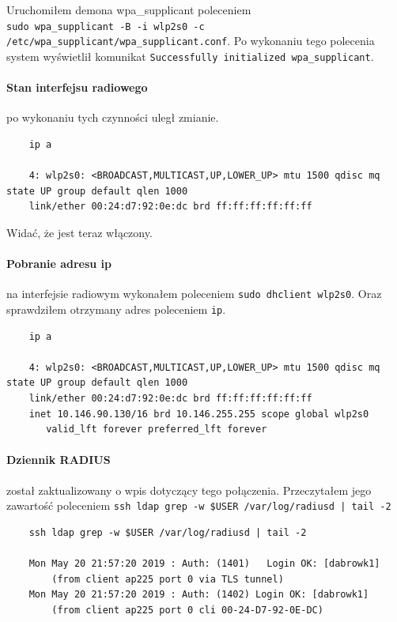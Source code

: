 \documentclass{article} %
\begin{document}
\vspace{5 mm}
Uruchomiłem demona wpa\_supplicant poleceniem \\\texttt{sudo wpa\_supplicant -B -i wlp2s0 -c /etc/wpa\_supplicant/wpa\_supplicant.conf}.
Po wykonaniu tego polecenia system wyświetlił komunikat \texttt{Successfully initialized wpa\_supplicant}.

\paragraph{Stan interfejsu radiowego} po wykonaniu tych czynności uległ zmianie.
\begin{lstlisting}
    ip a

    4: wlp2s0: <BROADCAST,MULTICAST,UP,LOWER_UP> mtu 1500 qdisc mq state UP group default qlen 1000
    link/ether 00:24:d7:92:0e:dc brd ff:ff:ff:ff:ff:ff
\end{lstlisting}
Widać, że jest teraz włączony.

\paragraph{Pobranie adresu ip} na interfejsie radiowym wykonałem poleceniem \texttt{sudo dhclient wlp2s0}. Oraz sprawdziłem otrzymany adres poleceniem \texttt{ip}.
\begin{lstlisting}
    ip a

    4: wlp2s0: <BROADCAST,MULTICAST,UP,LOWER_UP> mtu 1500 qdisc mq state UP group default qlen 1000
    link/ether 00:24:d7:92:0e:dc brd ff:ff:ff:ff:ff:ff
    inet 10.146.90.130/16 brd 10.146.255.255 scope global wlp2s0
       valid_lft forever preferred_lft forever
\end{lstlisting}

\paragraph{Dziennik RADIUS} został zaktualizowany o wpis dotyczący tego połączenia.
Przeczytałem jego zawartość poleceniem \texttt{ssh ldap grep -w \$USER /var/log/radiusd | tail -2}
\begin{lstlisting}
    ssh ldap grep -w $USER /var/log/radiusd | tail -2

    Mon May 20 21:57:20 2019 : Auth: (1401)   Login OK: [dabrowk1] 
        (from client ap225 port 0 via TLS tunnel) 
    Mon May 20 21:57:20 2019 : Auth: (1402) Login OK: [dabrowk1] 
        (from client ap225 port 0 cli 00-24-D7-92-0E-DC)
\end{lstlisting}
\end{document}

